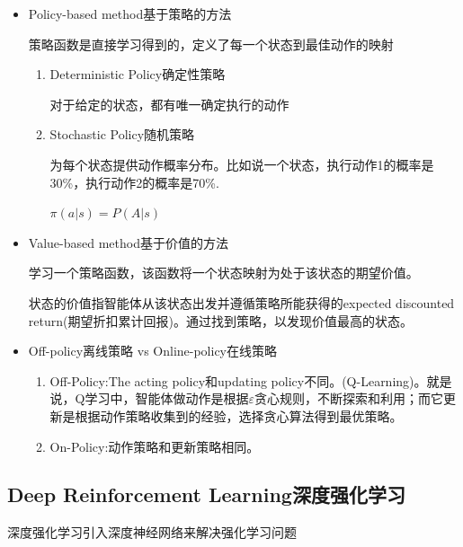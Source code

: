 \documentclass[UTF8]{ctexart}
\begin{document}
\begin{itemize}
    \item Policy-based method基于策略的方法
    
    策略函数是直接学习得到的，定义了每一个状态到最佳动作的映射

    \begin{enumerate}
        \item Deterministic Policy确定性策略
        
        对于给定的状态，都有唯一确定执行的动作
        \item Stochastic Policy随机策略
        
        为每个状态提供动作概率分布。比如说一个状态，执行动作1的概率是30\%，执行动作2的概率是70\%.

        $\pi(a|s)=P(A|s)$
    \end{enumerate}

    \item Value-based method基于价值的方法
    
    学习一个策略函数，该函数将一个状态映射为处于该状态的期望价值。

    状态的价值指智能体从该状态出发并遵循策略所能获得的expected discounted return(期望折扣累计回报)。通过找到策略，以发现价值最高的状态。

    \item Off-policy离线策略 vs Online-policy在线策略
    \begin{enumerate}
        \item Off-Policy:The acting policy和updating policy不同。(Q-Learning)。就是说，Q学习中，智能体做动作是根据$\varepsilon$贪心规则，不断探索和利用；而它更新是根据动作策略收集到的经验，选择贪心算法得到最优策略。
        \item On-Policy:动作策略和更新策略相同。
    \end{enumerate}
\end{itemize}


\subsection{Deep Reinforcement Learning深度强化学习}

深度强化学习引入深度神经网络来解决强化学习问题
\end{document}

